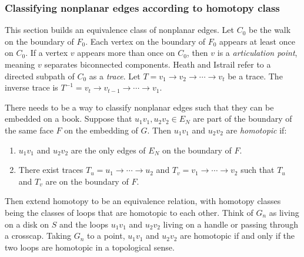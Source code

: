 

\subsubsection{Classifying nonplanar edges according to homotopy class}

This section builds an equivalence class of nonplanar edges. Let \(C_0\) be the walk on the boundary of \(F_0\). Each vertex on the boundary of \(F_0\) appears at least once on $C_0$. If a vertex $v$ appears more than once on $C_0$, then $v$ is a \textit{articulation point}, meaning $v$ separates biconnected components. Heath and Istrail refer to a directed subpath of \(C_0\) as a \textit{trace}. Let \(T = v_1 \rightarrow v_2 \rightarrow \cdots \rightarrow v_t\) be a trace. The inverse trace is \(T^{-1} = v_t \rightarrow v_{t-1} \rightarrow \cdots \rightarrow v_1\).

There needs to be a way to classify nonplanar edges such that they can be embedded on a book. Suppose that \(u_1v_1, u_2v_2 \in E_N\) are part of the boundary of the same face \(F\) on the embedding of \(G\). Then \(u_1v_1\) and \(u_2v_2\) are \textit{homotopic} if:
\begin{enumerate}
	\item \(u_1v_1\) and \(u_2v_2\) are the only edges of \(E_N\) on the boundary of \(F\).
	\item There exist traces \(T_u = u_1 \rightarrow \cdots \rightarrow u_2\) and \(T_v = v_1 \rightarrow \cdots \rightarrow v_2\) such that \(T_u\) and \(T_v\) are on the boundary of \(F\).
\end{enumerate}
Then extend homotopy to be an equivalence relation, with homotopy classes being the classes of loops that are homotopic to each other. 
Think of \(G_n\) as living on a disk on \(S\) and the loops \(u_1v_1\) and \(u_2 v_2\) living on a handle or passing through a crosscap. Taking \(G_n\) to a point, \(u_1v_1\) and \(u_2v_2\) are homotopic if and only if the two loops are homotopic in a topological sense.

